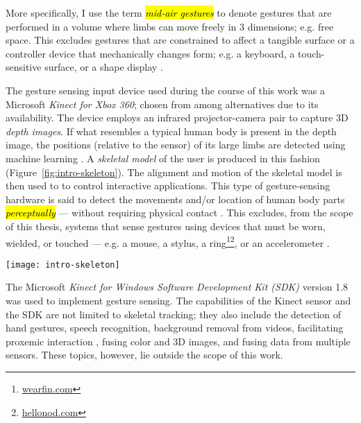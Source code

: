 More specifically, I use the term \hl{\emph{mid-air gestures}} to denote gestures that are performed in a volume where limbs can move freely in 3 dimensions; e.g. free space. This excludes gestures that are constrained to affect a tangible surface or a controller device that mechanically changes form; e.g. a keyboard, a touch-sensitive surface, or a shape display \parencite{Follmer:2013}.

The gesture sensing input device used during the course of this work was a Microsoft \emph{Kinect for Xbox 360}; chosen from among alternatives due to its availability. The device employs an infrared projector-camera pair to capture 3D \emph{depth images}. If what resembles a typical human body is present in the depth image, the positions (relative to the sensor) of its large limbs are detected using machine learning \parencite{Girshick:2011, Shotton:2011, Shotton:2012, Shotton:2013}. A \emph{skeletal model} of the user is produced in this fashion (Figure~\ref{fig:intro-skeleton}). The alignment and motion of the skeletal model is then used to to control interactive applications. This type of gesture-sensing hardware is said to detect the movements and/or location of human body parts \hl{\emph{perceptually}} --- without requiring physical contact \parencite{Turk:2000, Crowley:2000}. This excludes, from the scope of this thesis, systems that sense gestures using devices that must be worn, wielded, or touched --- e.g. a mouse, a stylus, a ring\footnote{\href{http://www.wearfin.com/}{wearfin.com}}\footnote{\href{https://www.hellonod.com/}{hellonod.com}}, or an accelerometer \parencite{Kela:2006, Ashbrook:2010}.

\begin{SCfigure}[\sidecaptionrelwidth][ht]
\centering
\texttt{[image: intro-skeleton]}
\caption{The Microsoft Kinect sensor employs an infrared projector-camera pair to capture 3D depth images, and fits a skeletal model onto what resembles a  human body in the image.}
\label{fig:intro-skeleton}
\end{SCfigure}

The Microsoft \emph{Kinect for Windows Software Development Kit (SDK)} version 1.8 was used to implement gesture sensing. The capabilities of the Kinect sensor and the SDK are not limited to skeletal tracking; they also include the detection of hand gestures, speech recognition, background removal from videos, facilitating proxemic interaction \parencite{Ballendat:2010}, fusing color and 3D images, and fusing data from multiple sensors. These topics, however, lie outside the scope of this work.

